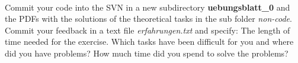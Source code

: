 \\
Commit your code into the SVN in a new subdirectory 
\textbf{uebungsblatt\_0\ExerciseSheetNumber} and the PDFs with the solutions of the 
theoretical tasks in the sub folder \textit{non-code}. Commit your feedback in a text file 
\emph{erfahrungen.txt} and specify: The length of time needed for 
the exercise. Which tasks have been difficult for you and where did you have 
problems? How much time did you spend to solve the problems?

